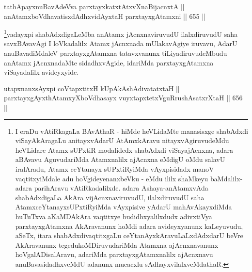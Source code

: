 \begin{shl}
tathA\s payxnuBavAdeVva parxtayxkatxtAtxvXnaBijacnxtA || \\
anAtamxboVdhavatisxdAdhx\s vidAyx\s taH parxtayxgAtamxni \hfill || 655 ||  
\end{shl}

\begin{artha}
\footnote{I eraDu vAtiRkagaLa BAvAthaR - hiMde heVLidaMte manasisxge
shabAdxdi viSayAkAragaLu anitayxvAdarU AtAmxkAravu
nitayxvAgiruvudeMdu heVLidare Atamx sUPxtiR modalidedx shabAdxdi
viSayajAcnxna, adara aBAvavu AguvudariMda Atamxnalilx ajAcnxna
eMdigU oMdu salavU iralAradu, Atamx ceYtanayx sUPxtiRyiMda
vAyxpisidadx manoV vaqtitxyiMdale adu hoVgideyenanxbeVku - eMdu
ililx  shaMkeyu baMdalilx-adara parihAravu vAtiRkadalilxde. adara
Ashaya-anAtamxvAda shabAdxdigaLa AkAra vijAcnxnaviruvudU,
ilalxdiruvudU saha AtamxceYtanayxsUPxtiRyiMda vAyxpisive yAdarU
mahAvAkayxdiMda huTuTxva aKaMDAkAra vaqtitxye budidhxyalilxdudx
adivxtiVya parxtayxgAtamxna AkAravanunx hoMdi adara avideyxyanunx
kaLeyuvudu, aSeTx, itara shabAdxdivaqtitxgaLu ceYtanAyxkAravuLaLxdAdxdarU beVre AkAravanunx tegedukoMDiruvudariMda
Atamxna ajAcnxnavanunx hoVgalADisalAravu, adariMda
parxtayxgAtamxnalilx ajAcnxnavu anuBavasidadhxveMdU adanunx mucacxlu
sAdhayxvilalxveMdathaR.}yadayxpi shabAdxdigaLeMba anAtamx jAcnxnaviruvudU
ilalxdiruvudU saha savxBAvavAgi I loVkadalilx Atamx jAcnxnada
mUlakavAgiye iruvavu, AdarU anuBavadiMdaleV parxtayxgAtamxna
tatavxvanunx tiLiyadiruvudeMbudu anAtamx jAcnxnadaMte sidadhxvAgide,
idariMda parxtayxgAtamxna viSayadalilx avideyxyide.
\end{artha}


\begin{shl}
\footnotemark[1]utapxnanxsAyxpi coVtapxtitxH kUpAkAshAdivatatxtaH ||  \\
parxtayxgAyxthAtamxyXboVdhasayx vuyxtapxtetxVguRrushAsatxrXtaH \hfill || 656 ||
\end{shl}

